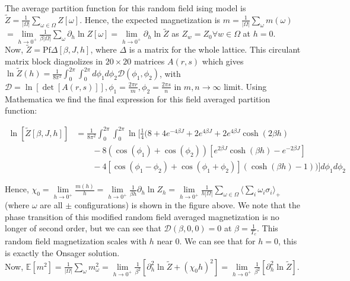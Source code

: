 \documentclass{article}
\begin{document}
	 The average partition function for this random field ising model is $\tilde Z=\frac{1}{|\Omega|}\sum_{\omega \in \Omega} Z[\omega]$. Hence, the expected magnetization is $m=\frac{1}{|\Omega|}\sum_{\omega} m(\omega) $$= \lim \limits_{h \to 0^+}\frac{1}{\beta |\Omega|} \sum_{\omega} \partial_h \ln Z[\omega] = \lim \limits_{h \to 0^{+}} \partial_h \ln \tilde Z$ as $Z_w=Z_0 \forall w \in \Omega$ at $h=0$. \\
	 
	 Now, $\tilde Z=\text{Pf}\Delta[\beta, J, h]$, where $\Delta$ is a  matrix for the whole lattice. 
	 This circulant matrix block diagnolizes in $20 \times 20$ matrices $A(r,s)$ which gives $\ln \tilde Z(h)=\frac{1}{8 \pi^2}\int_{0}^{2 \pi} \int_{0}^{2 \pi}d\phi_1 d\phi_2 \mathcal{D}(\phi_1,\phi_2)$, with $\mathcal D=\ln [\det[A(r,s)]], \phi_1=\frac{2\pi r}{m}, \phi_2=\frac{2\pi s}{n}$ in $m,n \to \infty$ limit.  Using Mathematica we find the final expression for this field averaged partition function: 
	
	\begin{align}
		\ln[\tilde Z[\beta, J, h]] &= \frac{1}{8\pi^2} \int_{0}^{2\pi} \int_{0}^{2\pi} \ln \Bigg[ \frac{1}{4} \Bigg( 8 + 4e^{-4\beta J} + 2e^{4\beta J} + 2e^{4\beta J}\cosh(2\beta h) \nonumber \\
		&\qquad - 8(\cos(\phi_1) + \cos(\phi_2))[e^{2\beta J}\cosh(\beta h)-e^{-2\beta J}] \nonumber \\
		&\qquad -4[\cos(\phi_1-\phi_2)+ \cos(\phi_1+\phi_2)](\cosh(\beta h)-1) \nonumber
		\Bigg) \Bigg] d\phi_1 d\phi_2
	\end{align} 
	
	Hence, $\chi_0=\lim \limits_{h \to 0^+} \frac{m(h)}{h}=\lim \limits_{h \to 0^+} \frac{1}{\beta h}\partial_h \ln Z_h = \lim \limits_{h \to 0^+}  \frac{1}{h|\Omega|}\sum_{\omega \in \Omega} \langle \sum_{i} \omega_i \sigma_i \rangle_{+}$ (where $\omega$ are all $\pm$ configurations) is shown in the figure above. We note that the phase transition of this modified random field averaged magnetization is no longer of second order, but we can see that $\mathcal D(\beta, 0,0)=0$ at $\beta=\frac{1}{T_c}$. This random field magnetization scales with $h$ near $0$. We can see that for $h=0$, this is exactly the Onsager solution.\\ 
	
	
	Now, $\mathbb E[m^2]=\frac{1}{|\Omega|}\sum_{\omega} m^2_{\omega} =\lim \limits_{h \to 0^+} \frac{1}{\beta^2}[\partial^2_h \ln \tilde Z+(\chi_0 h)^2] = \lim \limits_{h \to 0^+} \frac{1}{\beta^2}[\partial^2_h \ln \tilde Z]$. \\
	
\end{document}
